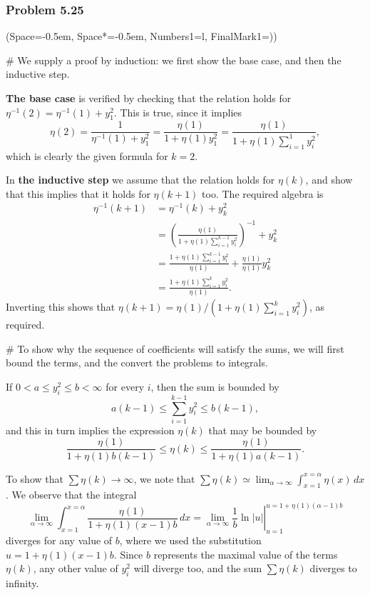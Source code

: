 \documentclass[12pt, a4paper]{article}
\newcommand{\listSpace}{-0.5em}%
\newcommand{\abs}[1]{\left\lvert#1\right\rvert}
\begin{document}
\subsubsection*{Problem 5.25}
\begin{easylist}[enumerate]
\ListProperties(Space=\listSpace, Space*=\listSpace, Numbers1=l, FinalMark1={)})

# We supply a proof by induction: we first show the base case, and then the inductive step.

\textbf{The base case} is verified by checking that the relation holds for $\eta^{-1}(2) = \eta^{-1}(1) + y_1^2$.
This is true, since it implies
\begin{equation*}
	\eta(2) = \frac{1}{\eta^{-1}(1) + y_1^2}
	= \frac{\eta(1)}{1 + \eta(1) y_1^2}
	= \frac{\eta(1)}{1 + \eta(1) \sum_{i=1}^{1}y_i^2},
\end{equation*}
which is clearly the given formula for $k = 2$.

In \textbf{the inductive step} we assume that the relation holds for $\eta(k)$, and show that this implies that it holds for $\eta(k+1)$ too.
The required algebra is
\begin{align*}
	\eta^{-1}(k+1) &= \eta^{-1}(k) + y_k^2 \\
&= \left( \frac{\eta(1)}{1 + \eta(1) \sum_{i=1}^{k-1}y_i^2 }  \right)^{-1} + y_k^2 \\
&= \frac{1 + \eta(1) \sum_{i=1}^{k-1}y_i^2}{\eta(1) } + \frac{\eta(1)}{\eta(1)}y_k^2 \\
&= \frac{1 + \eta(1) \sum_{i=1}^{k}y_i^2}{\eta(1)}.
\end{align*}
Inverting this shows that $\eta(k+1) = \eta(1) / \left( 1 + \eta(1) \sum_{i=1}^{k}y_i^2 \right)$, as required.



# To show why the sequence of coefficients will satisfy the sums, we will first bound the terms, and the convert the problems to integrals.

If $0 < a \leq y_i^2 \leq b < \infty$ for every $i$, then the sum is bounded by
\begin{equation*}
	a(k-1) \leq \sum_{i=1}^{k-1} y_i^2 \leq b(k-1),
\end{equation*}
and this in turn implies the expression $\eta(k)$ that may be bounded by
\begin{equation*}
	\frac{\eta(1)}{1 + \eta(1) b(k-1)} \leq \eta(k) \leq\frac{\eta(1)}{1 + \eta(1) a(k-1)}.
\end{equation*}

To show that $\sum \eta(k) \to \infty$, we note that $\sum \eta(k) \simeq \lim_{\alpha \to \infty} \int_{x=1}^{x=\alpha} \eta(x) \, dx $.
We observe that the integral
\begin{equation*}
	\lim_{\alpha \to \infty} \int_{x=1}^{x=\alpha} \frac{\eta(1)}{1 + \eta(1)(x-1)b} \, dx 
	= 
	\lim_{\alpha \to \infty} \left. \frac{1}{b} \ln \abs{u} \right|_{u=1}^{u=1 + \eta(1) (\alpha - 1)b}
\end{equation*}
diverges for any value of $b$, where we used the substitution $u = 1 + \eta(1)(x-1)b$.
Since $b$ represents the maximal value of the terms $\eta(k)$, any other value of $y_i^2$ will diverge too, and the sum $\sum \eta(k)$ diverges to infinity.


\end{easylist}
\end{document}
